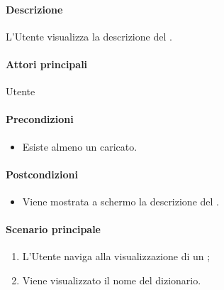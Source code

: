 \paragraph*{Descrizione}
L’Utente visualizza la descrizione del .

\paragraph*{Attori principali}
Utente

\paragraph*{Precondizioni}
\begin{itemize}
  \item Esiste almeno un  caricato.
\end{itemize}

\paragraph*{Postcondizioni}
\begin{itemize}
  \item Viene mostrata a schermo la descrizione del .
\end{itemize}

\paragraph*{Scenario principale}
\begin{enumerate}
  \item L’Utente naviga alla visualizzazione di un ;
  \item Viene visualizzato il nome del dizionario.
\end{enumerate}
